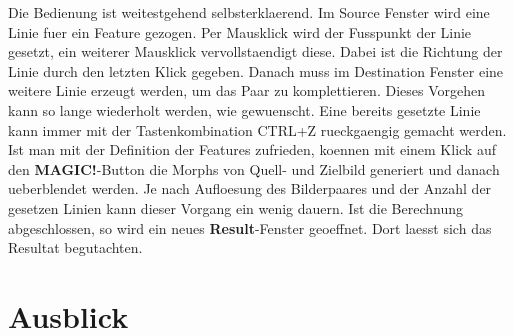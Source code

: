 Die Bedienung ist weitestgehend selbsterklaerend. Im Source
Fenster wird eine Linie fuer ein Feature gezogen. Per
Mausklick wird der Fusspunkt der Linie gesetzt, ein weiterer
Mausklick vervollstaendigt diese. Dabei ist die Richtung der Linie
durch den letzten Klick gegeben. Danach muss
im Destination Fenster eine weitere Linie erzeugt werden, um das
Paar zu komplettieren. Dieses Vorgehen kann so lange wiederholt
werden, wie gewuenscht. Eine bereits gesetzte Linie kann immer mit
der Tastenkombination CTRL+Z rueckgaengig gemacht werden.
Ist man mit der Definition der Features zufrieden, koennen mit einem
Klick auf den \textbf{MAGIC!}-Button die Morphs von Quell- und Zielbild
generiert und danach ueberblendet werden. Je nach Aufloesung des Bilderpaares
und der Anzahl der gesetzen Linien kann dieser Vorgang ein wenig
dauern. Ist die Berechnung abgeschlossen, so wird ein
neues \textbf{Result}-Fenster geoeffnet. Dort laesst sich das
Resultat begutachten.

\section{Ausblick}




